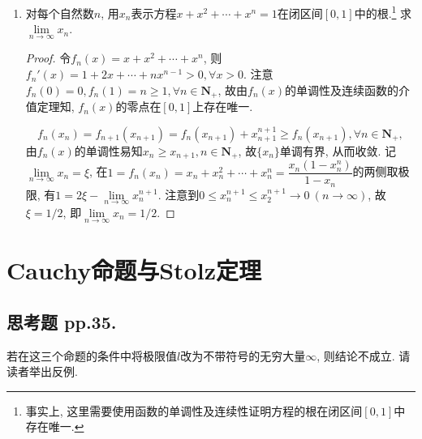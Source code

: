 \documentclass[a4paper,11pt,twoside]{ctexbook}
\begin{document}
\begin{enumerate}
\begin{proof}
		      充分性. 不妨设$\{a_n\}$单调增加, 则其任意子列也单调增加. 设$\lim\limits_{n\to\infty} x_{n_k}=a$. 则由3可知, $\forall k\in\mathbf{N}_{+}, a_{n_k}\leqslant a$. 若$\{a_n\}$无上界, 则存在$n_0\in\mathbf{N}_{+}$使得$x_{n_0}>a$, 从而对于充分大的$k\in\mathbf{N}_{+}$, 有$a_{n_k}\geqslant a_{n_0}>a$. 这与$a_{n_k}\leqslant a, \forall k\in\mathbf{N}_{+}$矛盾. 故$\{a_n\}$有上界. 从而由单调有界原理, $\{a_n\}$收敛.
	      \end{proof}
	\item 对每个自然数$n$, 用$x_n$表示方程$x+x^2+\cdots+x^n=1$在闭区间$[0,1]$中的根.\footnote{事实上, 这里需要使用函数的单调性及连续性证明方程的根在闭区间$[0,1]$中存在唯一.} 求$\lim\limits_{n\to\infty} x_n$.
	      \begin{proof}
		      令$f_n(x)=x+x^2+\cdots+x^n$, 则$f_n'(x)=1+2x+\cdots+nx^{n-1}>0, \forall x>0$. 注意$f_n(0)=0, f_n(1)=n\geqslant 1, \forall n\in\mathbf{N}_{+}$, 故由$f_n(x)$的单调性及连续函数的介值定理知, $f_n(x)$的零点在$[0,1]$上存在唯一.

		      \[
			      f_n(x_n)=f_{n+1}(x_{n+1})=f_n(x_{n+1})+x_{n+1}^{n+1}\geqslant f_n(x_{n+1}), \forall n\in\mathbf{N}_{+},
		      \]
		      由$f_n(x)$的单调性易知$x_n\geqslant x_{n+1}, n\in\mathbf{N}_{+}$, 故$\{x_n\}$单调有界, 从而收敛. 记$\lim\limits_{n\to\infty} x_n=\xi$, 在$1=f_n(x_n)=x_n+x_n^2+\cdots+x_n^n=\dfrac{x_n(1-x_n^n)}{1-x_n}$的两侧取极限, 有$1=2\xi-\lim\limits_{n\to\infty} x_n^{n+1}$. 注意到$0\leqslant x_n^{n+1}\leqslant x_2^{n+1}\to 0\ (n\to\infty)$, 故$\xi=1/2$, 即$\lim\limits_{n\to\infty} x_n=1/2$.\qedhere
	      \end{proof}
\end{enumerate}

\section{Cauchy命题与Stolz定理}
\subsection{思考题 pp.35.}
若在这三个命题的条件中将极限值$l$改为不带符号的无穷大量$\infty$, 则结论不成立. 请读者举出反例.
\end{document}
